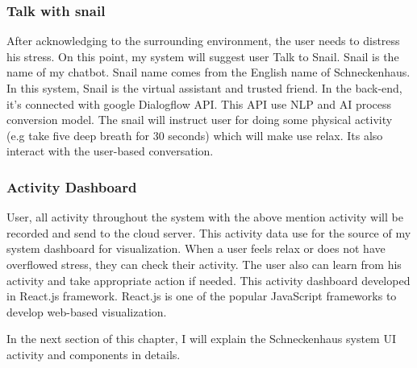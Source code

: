 \subsubsection*{Talk with snail}
After acknowledging to the surrounding environment, the user needs to distress his stress. On this point, my system will suggest user Talk to Snail. Snail is the name of my chatbot. Snail name comes from the English name of  Schneckenhaus. In this system, Snail is the virtual assistant and trusted friend. In the back-end, it's connected with google Dialogflow API. This API use \acs{NLP} and \acs{AI} process conversion model. The snail will instruct user for doing some physical activity (e.g take five deep breath for 30 seconds) which will make use relax. Its also interact with the user-based conversation.
\subsubsection*{Activity Dashboard}
User, all activity throughout the system with the above mention activity will be recorded and send to the cloud server. This activity data use for the source of my system dashboard for visualization. When a user feels relax or does not have overflowed stress, they can check their activity. The user also can learn from his activity and take appropriate action if needed. This activity dashboard developed in React.js framework. React.js is one of the popular JavaScript frameworks to develop web-based visualization.

In the next section of this chapter, I will explain the Schneckenhaus system UI activity and components in details.

